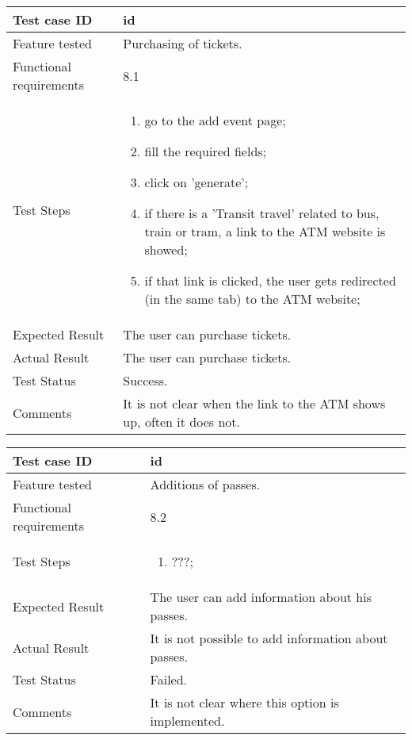 \begin{table}[H]
	\begin{center}
		\begin{tabular}{ | p{} | p{} | }
		\hline
		Test case ID & id\\
		\hline
		Feature tested & Purchasing of tickets.\\
    	\hline
		Functional requirements & 8.1  \\
		\hline
		Test Steps & 
			\begin{enumerate}
				\item go to the add event page;
				\item fill the required fields;
				\item click on 'generate';
				\item if there is a 'Transit travel' related to bus, train or tram, a link to the ATM website is showed;
				\item if that link is clicked, the user gets redirected (in the same tab) to the ATM website;
			\end{enumerate} \\
		\hline
		Expected Result & The user can purchase tickets.\\
		\hline
		Actual Result & The user can purchase tickets.\\ 
		\hline
		Test Status & \color{ForestGreen}Success.\\ 
		\hline
		Comments & It is not clear when the link to the ATM shows up, often it does not. \\ 
		\hline
		
		\end{tabular}
	\end{center}
\end{table}

\begin{table}[H]
	\begin{center}
		\begin{tabular}{ | p{} | p{} | }
		\hline
		Test case ID & id\\
		\hline
		Feature tested & Additions of passes.\\
    	\hline
		Functional requirements & 8.2  \\
		\hline
		Test Steps & 
			\begin{enumerate}
				\item ???;
			\end{enumerate} \\
		\hline
		Expected Result & The user can add information about his passes.\\
		\hline
		Actual Result & It is not possible to add information about passes.\\ 
		\hline
		Test Status & \color{Red}Failed.\\ 
		\hline
		Comments & It is not clear where this option is implemented. \\ 
		\hline
		
		\end{tabular}
	\end{center}
\end{table}

